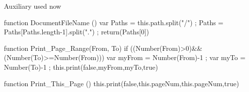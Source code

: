 
\startJSpreamble Auxiliary used now

  function DocumentFileName ()
    { var Paths = this.path.split("/") ;
      Paths = Paths[Paths.length-1].split(".") ;
      return(Paths[0]) }

  function Print_Page_Range(From, To) %
    { if ((Number(From)>0)&&(Number(To)>=Number(From)))
        { var myFrom = Number(From)-1 ;
          var myTo = Number(To)-1 ;
          this.print(false,myFrom,myTo,true) } }

  function Print_This_Page ()
    { this.print(false,this.pageNum,this.pageNum,true) }

\stopJSpreamble





\endinput
